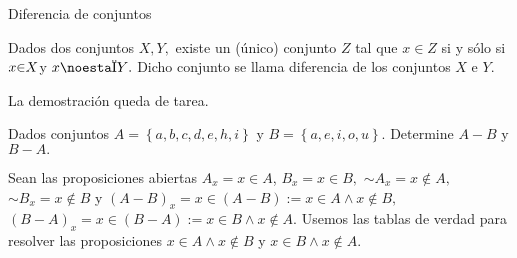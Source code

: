 \begin{teo}{Diferencia de conjuntos}{}

Dados dos conjuntos $X,Y,$ existe un (único) conjunto $Z$ tal que
$x\in Z$ si y sólo si $x\text{\ensuremath{\in}\ensuremath{X}}$y
$x\text{\ensuremath{\notin}\ensuremath{Y}.}$ Dicho conjunto se llama
diferencia de los conjuntos $X$ e $Y.$ 

\end{teo}

La demostración queda de tarea.

\begin{ejemplo}

Dados conjuntos $A=\left\{ a,b,c,d,e,h,i\right\} $ y $B=\left\{ a,e,i,o,u\right\} .$
Determine $A-B$ y $B-A.$ 

\end{ejemplo}

\solu Sean las proposiciones abiertas $A_{x}=x\in A$, $B_{x}=x\in B,$
$\sim A_{x}=x\notin A,$ $\sim B_{x}=x\notin B$ y $\left(A-B\right)_{x}=x\in\left(A-B\right):=x\in A\wedge x\notin B,$
$\left(B-A\right)_{x}=x\in\left(B-A\right):=x\in B\wedge x\notin A.$
Usemos las tablas de verdad para resolver las proposiciones $x\in A\wedge x\notin B$
y $x\in B\wedge x\notin A.$

